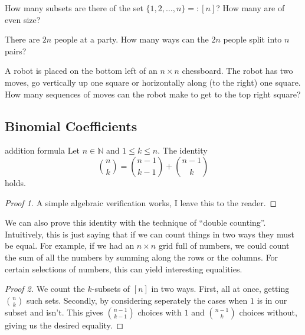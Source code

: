 \documentclass{article}
\begin{document}
\begin{exercise}[]{}
    How many subsets are there of the set $\{1, 2, \dots, n\} =: [n]$? How many are of even size? 
\end{exercise}

\begin{exercise}[]{}
    There are $2n$ people at a party. How many ways can the $2n$ people split into $n$ pairs? 
\end{exercise}

\begin{exercise}[]{}
    A robot is placed on the bottom left of an $n \times n$ chessboard. The robot has two moves, go vertically up one square or 
    horizontally along (to the right) one square. How many sequences of moves can the robot make to get to the top right square?
\end{exercise}

\newpage

\subsection{Binomial Coefficients}

\begin{lemma}[]{addition formula}
    Let $n \in \mathbb{N}$ and $1 \leq k \leq n$. The identity \[\binom{n}{k} = \binom{n-1}{k-1} + \binom{n-1}{k}\] holds.
\end{lemma}

\begin{proof}[Proof 1]
    A simple algebraic verification works, I leave this to the reader.
\end{proof}

We can also prove this identity with the technique of ``double counting''. Intuitively, this is just saying that if we can count things in two 
ways they must be equal. For example, if we had an $n \times n$ grid full of numbers, we could count the sum of all the numbers by summing along 
the rows or the columns. For certain selections of numbers, this can yield interesting equalities.  

\begin{proof}[Proof 2]
    We count the $k$-subsets of $[n]$ in two ways. First, all at once, getting $\binom{n}{k}$ such sets. Secondly, by considering seperately the 
    cases when $1$ is in our subset and isn't. This gives $\binom{n-1}{k-1}$ choices with $1$ and $\binom{n-1}{k}$ choices without, giving us the 
    desired equality. 
\end{proof}
\end{document}
